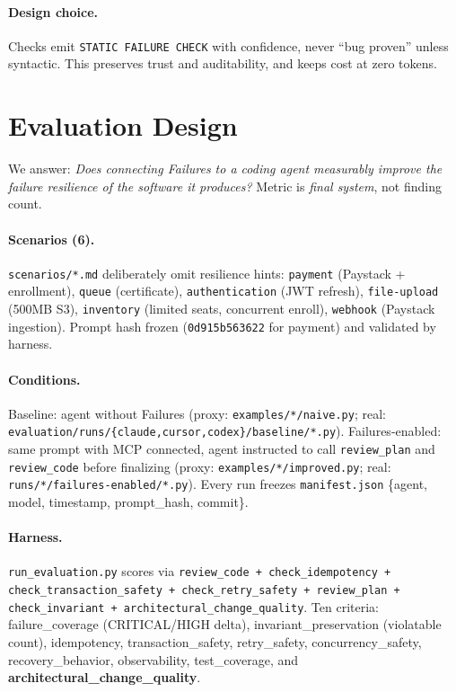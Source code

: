 \documentclass[conference]{IEEEtran}
\begin{document}
\paragraph{Design choice.} Checks emit \texttt{STATIC FAILURE CHECK} with confidence, never ``bug proven'' unless syntactic. This preserves trust and auditability, and keeps cost at zero tokens.
\section{Evaluation Design}
We answer: \emph{Does connecting Failures to a coding agent measurably improve the failure resilience of the software it produces?} Metric is \emph{final system}, not finding count.

\paragraph{Scenarios (6).} \texttt{scenarios/*.md} deliberately omit resilience hints:
\texttt{payment} (Paystack + enrollment), \texttt{queue} (certificate), \texttt{authentication} (JWT refresh), \texttt{file-upload} (500MB S3), \texttt{inventory} (limited seats, concurrent enroll), \texttt{webhook} (Paystack ingestion). Prompt hash frozen (\texttt{0d915b563622} for payment) and validated by harness.

\paragraph{Conditions.} Baseline: agent without Failures (proxy: \texttt{examples/*/naive.py}; real: \texttt{evaluation/runs/\{claude,cursor,codex\}/baseline/*.py}). Failures-enabled: same prompt with MCP connected, agent instructed to call \texttt{review\_plan} and \texttt{review\_code} before finalizing (proxy: \texttt{examples/*/improved.py}; real: \texttt{runs/*/failures-enabled/*.py}). Every run freezes \texttt{manifest.json} \{agent, model, timestamp, prompt\_hash, commit\}.

\paragraph{Harness.} \texttt{run\_evaluation.py} scores via \texttt{review\_code + check\_idempotency + check\_transaction\_safety + check\_retry\_safety + review\_plan + check\_invariant + architectural\_change\_quality}. Ten criteria: failure\_coverage (CRITICAL/HIGH delta), invariant\_preservation (violatable count), idempotency, transaction\_safety, retry\_safety, concurrency\_safety, recovery\_behavior, observability, test\_coverage, and \textbf{architectural\_change\_quality}.
\end{document}
